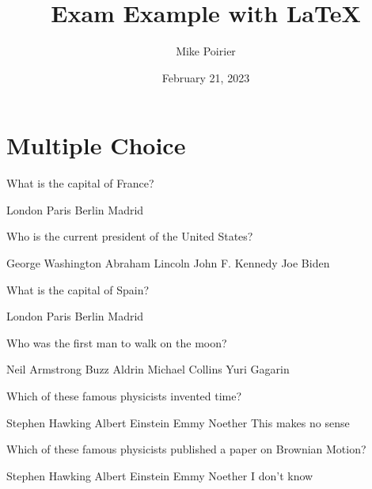 \documentclass[]{exam} %
\title{\textbf{Exam Example with \LaTeX \space [Questions]}}
\author{Mike Poirier}
\date{February 21, 2023}
\begin{document}
\maketitle

\section{Multiple Choice}

\begin{questions}

\question What is the capital of France?

\begin{randomizechoices}
\choice London
\correctchoice Paris
\choice Berlin
\choice Madrid
\end{randomizechoices}

\question Who is the current president of the United States?

\begin{randomizechoices}
\choice George Washington
\choice Abraham Lincoln
\choice John F. Kennedy
\correctchoice Joe Biden
\end{randomizechoices}

\question What is the capital of Spain?

\begin{randomizechoices}
\choice London
\choice Paris
\choice Berlin
\correctchoice Madrid
\end{randomizechoices}

\question Who was the first man to walk on the moon?

\begin{randomizechoices}
\correctchoice Neil Armstrong
\choice Buzz Aldrin
\choice Michael Collins
\choice Yuri Gagarin
\end{randomizechoices}

\question Which of these famous physicists invented time?

\begin{oneparchoices}
 \choice Stephen Hawking 
 \choice Albert Einstein
 \choice Emmy Noether
 \correctchoice This makes no sense
\end{oneparchoices}
    
\question Which of these famous physicists published a paper on Brownian Motion?

\begin{checkboxes}
 \choice Stephen Hawking 
 \correctchoice Albert Einstein
 \choice Emmy Noether
 \choice I don't know
\end{checkboxes}


\end{questions}
\end{document}
